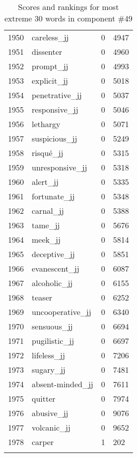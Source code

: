 \begin{longtable}[!htbp]{| rlr@{.}l |}
    1950 & careless\_jj & 0 & 4947 \\
    1951 & dissenter & 0 & 4960 \\
    1952 & prompt\_jj & 0 & 4993 \\
    1953 & explicit\_jj & 0 & 5018 \\
    1954 & penetrative\_jj & 0 & 5037 \\
    1955 & responsive\_jj & 0 & 5046 \\
    1956 & lethargy & 0 & 5071 \\
    1957 & suspicious\_jj & 0 & 5249 \\
    1958 & risqué\_jj & 0 & 5315 \\
    1959 & unresponsive\_jj & 0 & 5318 \\
    1960 & alert\_jj & 0 & 5335 \\
    1961 & fortunate\_jj & 0 & 5348 \\
    1962 & carnal\_jj & 0 & 5388 \\
    1963 & tame\_jj & 0 & 5676 \\
    1964 & meek\_jj & 0 & 5814 \\
    1965 & deceptive\_jj & 0 & 5851 \\
    1966 & evanescent\_jj & 0 & 6087 \\
    1967 & alcoholic\_jj & 0 & 6155 \\
    1968 & teaser & 0 & 6252 \\
    1969 & uncooperative\_jj & 0 & 6340 \\
    1970 & sensuous\_jj & 0 & 6694 \\
    1971 & pugilistic\_jj & 0 & 6697 \\
    1972 & lifeless\_jj & 0 & 7206 \\
    1973 & sugary\_jj & 0 & 7481 \\
    1974 & absent-minded\_jj & 0 & 7611 \\
    1975 & quitter & 0 & 7974 \\
    1976 & abusive\_jj & 0 & 9076 \\
    1977 & volcanic\_jj & 0 & 9652 \\
    1978 & carper & 1 & 202 \\
    \hline
    \caption{Scores and rankings for most extreme 30 words in component \#49} \\
\end{longtable}
